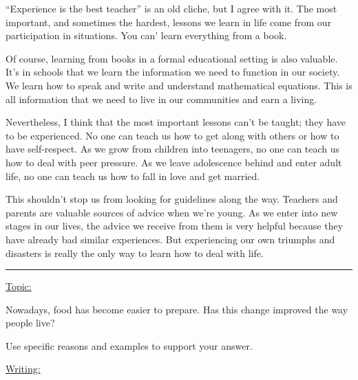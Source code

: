 \documentclass[UTF8]{ctexart}
\begin{document}
\normalsize{“Experience is the best teacher” is an old cliche, but I agree with it. The most important, and sometimes the hardest, lessons we learn in life come from our participation in situations. You can’ learn everything from a book.

Of course, learning from books in a formal educational setting is also valuable. It’s in schools that we learn the information we need to function in our society. We learn how to speak and write and understand mathematical equations. This is all information that we need to live in our communities and earn a living.

Nevertheless, I think that the most important lessons can’t be taught; they have to be experienced. No one can teach us how to get along with others or how to have self-respect. As we grow from children into teenagers, no one can teach us how to deal with peer pressure. As we leave adolescence behind and enter adult life, no one can teach us how to fall in love and get married.

This shouldn’t stop us from looking for guidelines along the way. Teachers and parents are valuable sources of advice when we’re young. As we enter into new stages in our lives, the advice we receive from them is very helpful because they have already bad similar experiences. But experiencing our own triumphs and disasters is really the only way to learn how to deal with life.}

\noindent\rule[0.5ex]{\linewidth}{0.25pt}
\LARGE{\underline{Topic:}}

\normalsize{Nowadays, food has become easier to prepare. Has this change improved the way people live?

Use specific reasons and examples to support your answer.}

\noindent
\LARGE{\underline{Writing:}}
\end{document}
